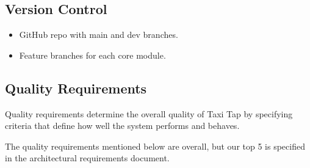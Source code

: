 \documentclass[a4paper,12pt]{article}
\begin{document}
\subsection{Version Control}
\begin{itemize}
    \item GitHub repo with main and dev branches.
    \item Feature branches for each core module.
\end{itemize}

\subsection{Quality Requirements}
Quality requirements determine the overall quality of Taxi Tap by specifying criteria that define how well the system performs and behaves.\newline

The quality requirements mentioned below are overall, but our top 5 is specified in the architectural requirements document.
\end{document}
